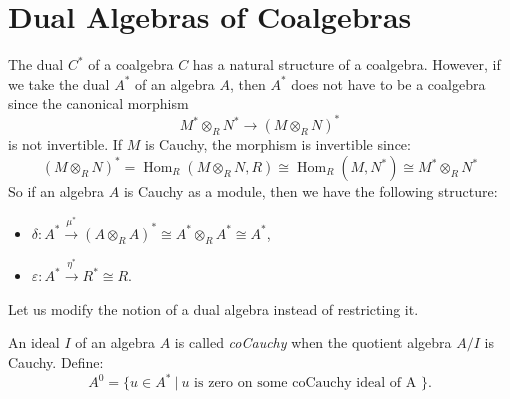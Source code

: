 \documentclass[8pt]{article}
\theoremstyle{definition}
\theoremstyle{definition}
\theoremstyle{definition}
\theoremstyle{definition}
\theoremstyle{definition}
\theoremstyle{definition}
\theoremstyle{definition}
\theoremstyle{definition}
\theoremstyle{definition}
\theoremstyle{definition}
\theoremstyle{definition}
\theoremstyle{definition}
\theoremstyle{definition}
\theoremstyle{definition}
\theoremstyle{question}
\begin{document}
\section{Dual Algebras of Coalgebras}

The dual $C^*$ of a coalgebra $C$ has a natural structure of a coalgebra. However, if we take
the dual $A^*$ of an algebra $A$, then $A^*$ does not have to be a coalgebra since the canonical morphism
\[
M^* \otimes_R N^* \to (M \otimes_R N)^*
\]
is not invertible. If $M$ is Cauchy, the morphism is invertible since:
\[
(M \otimes_R N)^* = \operatorname{Hom}_R(M \otimes_R N, R) \cong \operatorname{Hom}_R(M, N^*) \cong M^* \otimes_R N^*
\]
So if an algebra $A$ is Cauchy as a module, then we have the following structure:
\begin{itemize}
  \item $\delta : A^* \xrightarrow{\mu^{*}} (A \otimes_R A)^{*} \cong A^* \otimes_R A^* \cong A^*$,
  \item $\varepsilon : A^* \xrightarrow{\eta^{*}} R^* \cong R$.
\end{itemize}
Let us modify the notion of a dual algebra instead of restricting it.

An ideal $I$ of an algebra $A$ is called \emph{coCauchy} when the quotient algebra $A/I$ is Cauchy.
Define:
\[
A^0 = \{ u \in A^* \: | \: \text{$u$ is zero on some coCauchy ideal of A }\}.
\]
\end{document}
